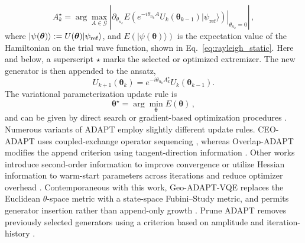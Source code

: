 \documentclass[
  reprint,
  amsmath,
  amssymb,
  aps,
  pra,
  nofootinbib,
  superscriptaddress,
  floatfix
]{revtex4-2}
\newcommand{\ket}[1]{|#1\rangle}
\begin{document}
\begin{equation}
A_k^\star=\arg\max_{A\in\mathcal G}
\left|
\left.
\partial_{\theta_{n_k}}E\!\left(e^{-i\theta_{n_k} A}U_k(\boldsymbol{\theta}_{k-1})\ket{\psi_{\mathrm{ref}}}\right)
\right|_{\theta_{n_k}=0}
\right|\,,
\label{eq:adapt_append_gradient}
\end{equation}
where $\ket{\psi(\boldsymbol{\theta})}:=U(\boldsymbol{\theta})\ket{\psi_{\rm ref}}$, and $E(\ket{\psi(\boldsymbol{\theta})})$ is the expectation value of the Hamiltonian on the trial wave function, shown in Eq.~\eqref{eq:rayleigh_static}. Here and below, a superscript $\star$ marks the selected or optimized extremizer. The new generator is then appended to the ansatz,
\begin{equation*}
U_{k+1}(\boldsymbol{\theta}_{k})=e^{-i\theta_{n_k} A_k^\star}U_k(\boldsymbol{\theta}_{k-1}).
\end{equation*}
The variational parameterization update rule is
\begin{equation}
\label{eq:theta_opt}
\boldsymbol{\theta}^\star=\arg\min_{\boldsymbol{\theta}}E(\boldsymbol{\theta})\,,
\end{equation}
%
and can be given by direct search or gradient-based optimization procedures \cite{BonetMonroig2023Optimizer,Singh2023Optimizers,Gacon2021QNSPSA}. Numerous variants of ADAPT employ slightly different update rules. CEO-ADAPT uses coupled-exchange operator sequencing \cite{Ramoa2025}, whereas Overlap-ADAPT modifies the append criterion using tangent-direction information \cite{Feniou2023}. Other works introduce second-order information to improve convergence \cite{Grimsley2023ADAPT} or utilize Hessian information to warm-start parameters across iterations and reduce optimizer overhead \cite{Ramoa2025HessianRecycling}.
Contemporaneous with this work, Geo-ADAPT-VQE replaces the Euclidean \(\theta\)-space metric with a state-space Fubini--Study metric, and permits generator insertion rather than append-only growth \cite{Sohail2026GeoADAPT}. Prune ADAPT removes previously selected generators using a criterion based on amplitude and iteration-history \cite{Vaquero2025PrunedADAPT}.
\end{document}
